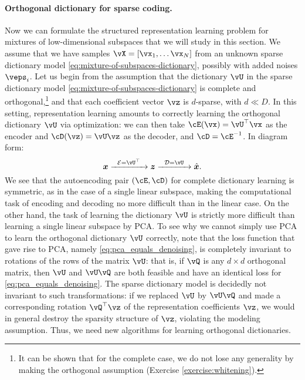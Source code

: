\documentclass[../../book-main.tex]{subfiles}
\begin{document}
\paragraph{Orthogonal dictionary for sparse coding.}
Now we can formulate the structured representation learning problem for mixtures of low-dimensional subspaces that we will study in this section.
We assume that we have samples $\vX = [\vx_1, \dots \vx_N]$ from an unknown sparse dictionary model \eqref{eq:mixture-of-subspaces-dictionary}, possibly with added noises $\veps_i$.
Let us begin from the assumption that the dictionary $\vU$ in the sparse
dictionary model \eqref{eq:mixture-of-subspaces-dictionary} is complete and
orthogonal,\footnote{It can be shown that for the complete case, we do not lose any generality by making the orthogonal assumption (Exercise \ref{exercise:whitening}).} and that each coefficient vector $\vz$ is $d$-sparse, with $d \ll D$.
In this setting, representation learning amounts to {correctly learning the orthogonal dictionary $\vU$ via optimization}: we
can then take $\cE(\vx) = \vU^\top \vx$ as the encoder and $\cD(\vz) = \vU \vz$
as the decoder, and $\cD = \cE^{-1}$. In diagram form:
\begin{equation}
\x \xrightarrow{\hspace{2mm} \mathcal{E} = \vU^\top \hspace{2mm}}  \z \xrightarrow{\hspace{2mm} \mathcal{D} = \vU \hspace{2mm}}   \hat{\x}.  
\label{eqn:autoencoding-DL}
\end{equation}    
We see that the autoencoding pair $(\cE, \cD)$ for complete dictionary learning is symmetric, as in the case of a single linear subspace, making the computational task of encoding and decoding no more difficult than in the linear case. On the other hand, the task of learning the dictionary $\vU$ is strictly more difficult than learning a single linear subspace by PCA. 
To see why we cannot simply use PCA to learn the orthogonal dictionary $\vU$ correctly, note that the 
loss function that gave rise to PCA, namely \eqref{eq:pca_equals_denoising}, is
completely invariant to rotations of the rows of the matrix $\vU$: that is, if
$\vQ$ is any $d \times d$ orthogonal matrix, then $\vU$ and $\vU \vQ$ are both
feasible and have an identical loss for \eqref{eq:pca_equals_denoising}. The
sparse dictionary model is decidedly not invariant to such transformations: if
we replaced $\vU$ by $\vU \vQ$ and made a corresponding rotation $\vQ^\top \vz$
of the representation coefficients $\vz$, we would in general destroy the sparsity structure of $\vz$, violating the modeling assumption. Thus, we need new algorithms for learning orthogonal dictionaries. 
\end{document}
